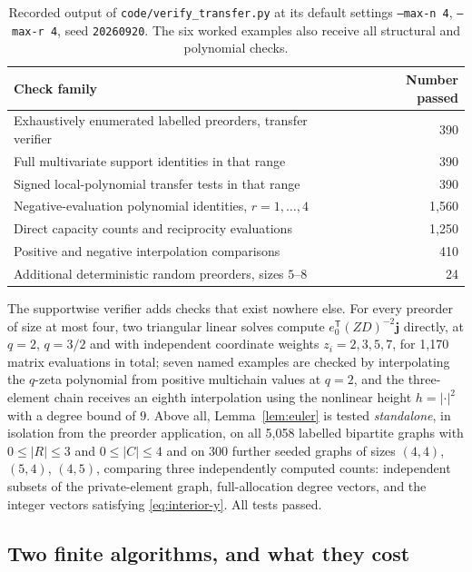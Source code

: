 \documentclass[11pt]{article}
\numberwithin{equation}{section}
\theoremstyle{definition}
\theoremstyle{remark}
\begin{document}
\begin{table}[htbp]
\centering\small
\begin{tabular}{@{}lr@{}}
\toprule
Check family & Number passed\\
\midrule
Exhaustively enumerated labelled preorders, transfer verifier & 390\\
Full multivariate support identities in that range & 390\\
Signed local-polynomial transfer tests in that range & 390\\
Negative-evaluation polynomial identities, $r=1,\ldots,4$ & 1,560\\
Direct capacity counts and reciprocity evaluations & 1,250\\
Positive and negative interpolation comparisons & 410\\
Additional deterministic random preorders, sizes $5$--$8$ & 24\\
\bottomrule
\end{tabular}
\caption{Recorded output of \texttt{code/verify\_transfer.py} at its default
settings \texttt{--max-n 4}, \texttt{--max-r 4}, seed \texttt{20260920}. The
six worked examples also receive all structural and polynomial checks.}
\label{tab:checks}
\end{table}

The supportwise verifier adds checks that exist nowhere else. For every
preorder of size at most four, two triangular linear solves compute
$e_0^{\mathsf T}(ZD)^{-2}\mathbf j$ directly, at $q=2$, $q=3/2$ and with
independent coordinate weights $z_i=2,3,5,7$, for 1,170 matrix evaluations in
total; seven named examples are checked by interpolating the $q$-zeta
polynomial from positive multichain values at $q=2$, and the three-element
chain receives an eighth interpolation using the nonlinear height $h=|\cdot|^2$
with a degree bound of $9$. Above all, Lemma~\ref{lem:euler} is tested
\emph{standalone}, in isolation from the preorder application, on all 5,058
labelled bipartite graphs with $0\le|R|\le3$ and $0\le|C|\le4$ and on 300
further seeded graphs of sizes $(4,4)$, $(5,4)$, $(4,5)$, comparing three
independently computed counts: independent subsets of the private-element
graph, full-allocation degree vectors, and the integer vectors satisfying
\eqref{eq:interior-y}. All tests passed.

\subsection{Two finite algorithms, and what they cost}
\end{document}
